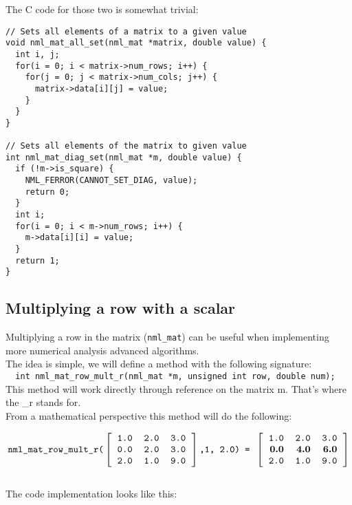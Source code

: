 The C code for those two is somewhat trivial:

\begin{verbatim}
// Sets all elements of a matrix to a given value
void nml_mat_all_set(nml_mat *matrix, double value) {
  int i, j;
  for(i = 0; i < matrix->num_rows; i++) {
    for(j = 0; j < matrix->num_cols; j++) {
      matrix->data[i][j] = value;
    }
  }
}

// Sets all elements of the matrix to given value
int nml_mat_diag_set(nml_mat *m, double value) {
  if (!m->is_square) {
    NML_FERROR(CANNOT_SET_DIAG, value);
    return 0;
  }
  int i;
  for(i = 0; i < m->num_rows; i++) {
    m->data[i][i] = value;
  }
  return 1;
} 
\end{verbatim}

\subsection{Multiplying a row with a scalar}

Multiplying a row in the matrix ({\tt nml\_mat}) can be useful when implementing more numerical analysis advanced algorithms.
\\

The idea is simple, we will define a method with the following signature:
\\

\texttt{
 \ int nml\_mat\_row\_mult\_r(nml\_mat *m, unsigned int row, double num);
 }
\\

This method will work directly through reference on the matrix m. That’s where the {\_r} stands for.
\\

From a mathematical perspective this method will do the following:

$$
\texttt{nml\_mat\_row\_mult\_r(}
\left[ \begin{tabular}{rrr}
\tt 1.0 & \tt 2.0 & \tt 3.0 \\
\tt 0.0 & \tt 2.0 & \tt 3.0 \\
\tt 2.0 & \tt 1.0 & \tt 9.0
\end{tabular} \right]
\texttt{,1, 2.0) = }
\left[ \begin{tabular}{rrr}
\tt 1.0 & \tt 2.0 & \tt 3.0 \\
\tt\bf 0.0 & \tt\bf 4.0 & \tt\bf 6.0 \\
\tt 2.0 & \tt 1.0 & \tt 9.0
\end{tabular} \right]
$$
\\
The code implementation looks like this:

